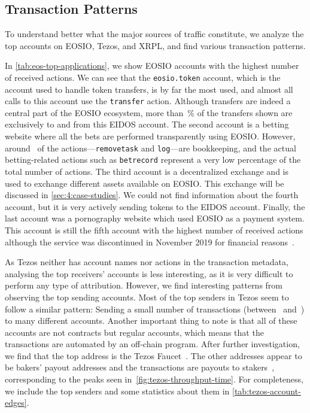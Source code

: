 

\subsection{Transaction Patterns}
To understand better what the major sources of traffic constitute, we analyze the top accounts on EOSIO, Tezos, and XRPL, and find various transaction patterns.

In \autoref{tab:eos-top-applications}, we show EOSIO accounts with the highest number of received actions.
We can see that the \texttt{eosio.token} account, which is the account used to handle  token transfers, is by far the most used, and almost all calls to this account use the \texttt{transfer} action.
Although  transfers are indeed a central part of the EOSIO ecosystem, more than~\% of the transfers shown are exclusively to and from this EIDOS account.
The second account is a betting website where all the bets are performed transparently using EOSIO.
However, around~ of the actions---\texttt{removetask} and \texttt{log}---are bookkeeping, and the actual betting-related actions such as \texttt{betrecord} represent a very low percentage of the total number of actions.
The third account is a decentralized exchange and is used to exchange different assets available on EOSIO. This exchange will be discussed in \autoref{sec:4:case-studies}.
We could not find information about the fourth account, but it is very actively sending  tokens to the EIDOS account.
Finally, the last account was a pornography website which used EOSIO as a payment system. This account is still the fifth account with the highest number of received actions although the service was discontinued in November 2019 for financial reasons~\cite{hashbaby-closing}.



As Tezos neither has account names nor actions in the transaction metadata, analysing the top receivers' accounts is less interesting, as it is very difficult to perform any type of attribution. However, we find interesting patterns from observing the top sending accounts.
Most of the top senders in Tezos seem to follow a similar pattern: Sending a small number of transactions (between~ and~) to many different accounts.
Another important thing to note is that all of these accounts are not contracts but regular accounts, which means that the transactions are automated by an off-chain program.
After further investigation, we find that the top address is the Tezos Faucet~\cite{tezos-faucet}. The other addresses appear to be bakers' payout addresses and the transactions are payouts to stakers~\cite{backerei}, corresponding to the peaks seen in~\autoref{fig:tezos-throughput-time}. For completeness, we include the top senders and some statistics about them in \autoref{tab:tezos-account-edges}.

